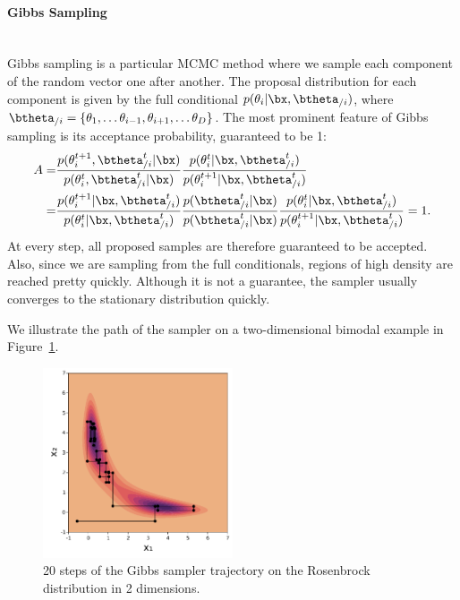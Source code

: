 \paragraph{Gibbs Sampling}\mbox{}\\
Gibbs sampling is a particular \ac{MCMC} method where we sample each component of the random vector one after another.
The proposal distribution for each component is given by the full conditional  $p(\theta_i|\bx,\btheta_{/i})$, where $\btheta_{/i}=\{\theta_1, \ldots \theta_{i-1}, \theta_{i+1},\ldots \theta_{D}\}$.
The most prominent feature of Gibbs sampling is its acceptance probability, guaranteed to be 1:
\begin{align*}
    A =& \frac{p(\theta^{t+1}_i,\btheta^t_{/i}|\bx)}{p(\theta^t_i,\btheta^t_{/i}|\bx)}\frac{p(\theta^t_i|\bx,\btheta^{t}_{/i})}{p(\theta^{t+1}_i|\bx,\btheta^t_{/i})}\\
    =& \frac{p(\theta^{t+1}_i|\bx, \btheta^{t}_{/i})}{p(\theta^t_i|\bx,\btheta^t_{/i})}\frac{p(\btheta^t_{/i}|\bx)}{p(\btheta^t_{/i}|\bx)}\frac{p(\theta^t_i|\bx,\btheta^{t}_{/i})}{p(\theta^{t+1}_i|\bx,\btheta^t_{/i})} = 1.
\end{align*}
At every step, all proposed samples are therefore guaranteed to be accepted.
Also, since we are sampling from the full conditionals, regions of high density are reached pretty quickly.
Although it is not a guarantee, the sampler usually converges to the stationary distribution quickly.

We illustrate the path of the sampler on a two-dimensional bimodal example in Figure~\ref{fig:gibbs_samp}.

\begin{figure}
\centering
\includegraphics[width=0.5\textwidth]{./chapters/2_background/figures/gibbs_sampling.pdf}
\caption{20 steps of the Gibbs sampler trajectory on the Rosenbrock distribution in 2 dimensions.}
\label{fig:gibbs_samp}
\end{figure}

